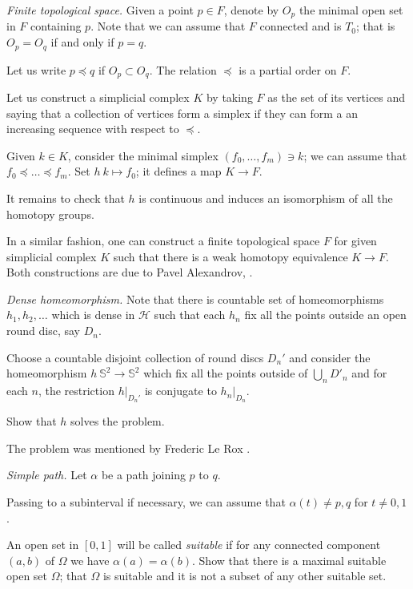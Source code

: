 \textit{Finite topological space.}
Given a point $p\in F$,
denote by $O_p$ the minimal open set in $F$ containing $p$. 
Note that we can assume that $F$ connected and is $T_0$;
that is $O_p=O_q$ if and only if $p=q$.

Let us write $p\preccurlyeq q$ 
if $O_p\subset O_q$.
The relation $\preccurlyeq$ is a partial order on $F$.

Let us construct a simplicial complex $K$ 
by taking $F$ as the set of its vertices
and saying that a collection of vertices form a simplex 
if they can form a an increasing sequence with respect to $\preccurlyeq$.

Given $k\in K$,
consider the minimal simplex $(f_0,\dots,f_m)\ni k$;
we can assume that $f_0\preccurlyeq \dots\preccurlyeq f_m$.
Set $h\:k\mapsto f_0$;
it defines a map $K\to F$.

It remains to check that $h$ is continuous 
and induces an isomorphism of all the homotopy groups.

In a similar fashion, one can construct a finite topological space $F$ for given simplicial complex $K$ 
such that 
there is a weak homotopy equivalence $K\to F$.
Both constructions are due to Pavel Alexandrov, 
\cite[see][]{alexandrov-finite,mccord}.

\textit{Dense homeomorphism.}
Note that there is countable set of homeomorphisms $h_1,h_2,\dots$ which is dense in $\mathcal{H}$
such that
each $h_n$ fix all the points outside an open round disc, say $D_n$.

Choose a countable disjoint collection of round discs $D_n'$
and consider the homeomorphism $h\:\mathbb S^2\to \mathbb S^2$
which fix all the points outside of $\bigcup_nD'_n$ and
for each $n$,
the restriction $h|_{D_n'}$ is conjugate to $h_n|_{D_n}$. 

Show that $h$ solves the problem.

The problem was mentioned by Frederic Le Rox \cite[see][]{rox}.

\textit{Simple path.}
Let $\alpha$ be a path joining $p$ to $q$.

Passing to a subinterval if necessary,
we can assume that $\alpha(t)\ne p,q$ for $t\ne0,1$.

An open set in $[0,1]$ will be called \emph{suitable}
if for any connected component $(a,b)$ of $\Omega$ we have $\alpha(a)=\alpha(b)$.
Show that there is a maximal suitable open set $\Omega$;
that $\Omega$ is suitable and it is not a subset of any other suitable set.

